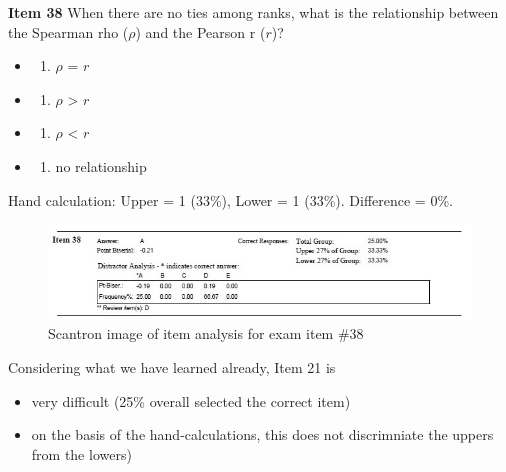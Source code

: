 \documentclass[
  english,
]{book}
\providecommand{\tightlist}{%
  \setlength{\itemsep}{0pt}\setlength{\parskip}{0pt}}
\begin{document}
\textbf{Item 38} When there are no ties among ranks, what is the relationship between the Spearman rho (\(\rho\)) and the Pearson r (\(r\))?

\begin{itemize}
\item
  \begin{enumerate}
  \def\labelenumi{\alph{enumi})}
  \tightlist
  \item
    \(\rho\) = \(r\)
  \end{enumerate}
\item
  \begin{enumerate}
  \def\labelenumi{\roman{enumi})}
  \setcounter{enumi}{1}
  \tightlist
  \item
    \(\rho\) \textgreater{} \(r\)
  \end{enumerate}
\item
  \begin{enumerate}
  \def\labelenumi{\alph{enumi})}
  \tightlist
  \item
    \(\rho\) \textless{} \(r\)
  \end{enumerate}
\item
  \begin{enumerate}
  \def\labelenumi{\alph{enumi})}
  \setcounter{enumi}{1}
  \tightlist
  \item
    no relationship
  \end{enumerate}
\end{itemize}

Hand calculation: Upper = 1 (33\%), Lower = 1 (33\%). Difference = 0\%.

\begin{figure}
\centering
\includegraphics{images/ItemAnalExam/Item38.jpg}
\caption{Scantron image of item analysis for exam item \#38}
\end{figure}

Considering what we have learned already, Item 21 is

\begin{itemize}
\tightlist
\item
  very difficult (25\% overall selected the correct item)
\item
  on the basis of the hand-calculations, this does not discrimniate the uppers from the lowers)
\end{itemize}
\end{document}
